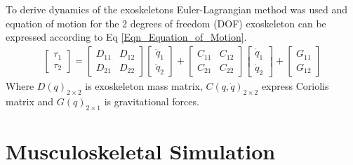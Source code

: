 \documentclass[10pt,letterpaper]{article}
\begin{document}
To derive dynamics of the exoskeletons Euler-Lagrangian method was used and equation of motion for the 2 degrees of freedom (DOF) exoskeleton can be expressed according to Eq \eqref{Eqn_Equation_of_Motion}.
\begin{gather}\label{Eqn_Equation_of_Motion}
\begin{bmatrix}
\tau_{1}\\
\tau_{2}
\end{bmatrix}
=
\begin{bmatrix}
D_{11}&D_{12}\\
D_{21}&D_{22}
\end{bmatrix}
\begin{bmatrix}
\ddot{q}_{1}\\
\ddot{q}_{2}
\end{bmatrix}
+
\begin{bmatrix}
C_ {11}& C_ {12}\\ C_ {21}& C_ {22}
\end{bmatrix}
\begin{bmatrix}
\dot{q}_{1}\\
\dot{q}_{2}
\end{bmatrix}
+
\begin{bmatrix}
G_ {11}\\ G_ {12}
\end{bmatrix}
\end{gather}
Where $D(q)_{2 \times 2}$ is exoskeleton mass matrix, $C(q,\dot{q})_{2 \times 2}$ express Coriolis matrix and $G(q)_{2 \times 1}$ is gravitational forces.\\
\section*{Musculoskeletal Simulation}
\end{document}
